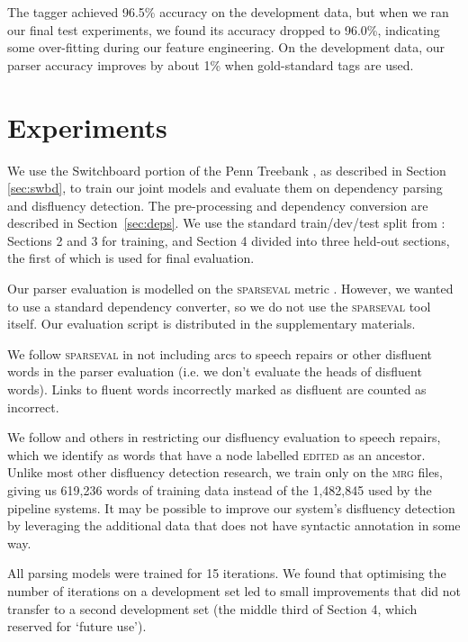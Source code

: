 \documentclass[11pt,letterpaper]{article}
\newcommand{\sparseval}{\textsc{sparseval}\xspace}
\begin{document}
The tagger achieved 96.5\% accuracy on the development data, but when we ran our
final test experiments, we found its accuracy dropped to 96.0\%, indicating
some over-fitting during our feature engineering.  On the development data,
our parser accuracy improves by about 1\% when gold-standard tags are used.

\section{Experiments}

We use the Switchboard portion of the Penn Treebank \citep{marcus:93}, as
described in Section \ref{sec:swbd}, to train our joint
models and evaluate them on dependency parsing and disfluency detection. The
pre-processing and dependency conversion are described in Section~\ref{sec:deps}.
We use the standard train/dev/test split from \citet{Charniak01a}: Sections 2
and 3 for training, and Section 4 divided into three held-out sections, the first
of which is used for final evaluation.

Our parser evaluation is modelled on the \sparseval metric \citep{sparseval}.
However, we wanted to use a standard dependency converter, so we
do not use the \sparseval tool itself.  Our evaluation script is distributed
in the supplementary materials.

We follow \sparseval in not including arcs to speech repairs or other disfluent
words in the parser evaluation (i.e. we don't evaluate the heads of disfluent
words).  Links to fluent words incorrectly marked as disfluent are counted as
incorrect.  

We follow \citet{Johnson04a} and others in restricting our disfluency evaluation
to speech repairs, which we identify as words that have a node labelled \textsc{edited}
as an ancestor.  Unlike most other disfluency detection research, we train only
on the \textsc{mrg} files, giving us 619,236 words of training data instead of
the 1,482,845 used by the pipeline systems.  It may be possible to improve our
system's disfluency detection by leveraging the additional data that does not
have syntactic annotation in some way.

All parsing models were trained for 15 iterations.
We found that optimising the number of iterations on a development set led to
small improvements that did not transfer to a second development set (the middle
third of Section 4, which \citet{Charniak01a} reserved for `future use').
\end{document}
